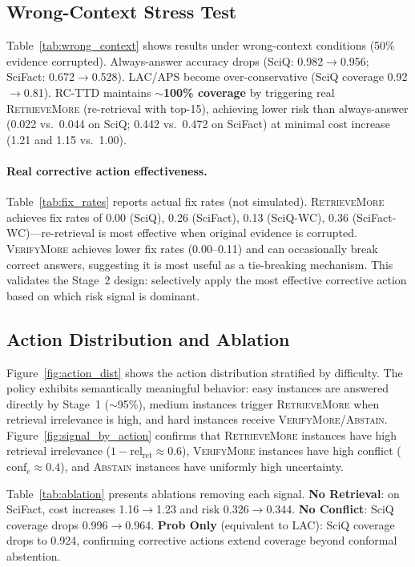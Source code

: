\documentclass[letterpaper]{article}
\begin{document}
\subsection{Wrong-Context Stress Test}

Table~\ref{tab:wrong_context} shows results under wrong-context conditions (50\% evidence corrupted). Always-answer accuracy drops (SciQ: 0.982$\to$0.956; SciFact: 0.672$\to$0.528). LAC/APS become over-conservative (SciQ coverage 0.92$\to$0.81). RC-TTD maintains \textbf{$\sim$100\% coverage} by triggering real \textsc{RetrieveMore} (re-retrieval with top-15), achieving lower risk than always-answer (0.022 vs.\ 0.044 on SciQ; 0.442 vs.\ 0.472 on SciFact) at minimal cost increase (1.21 and 1.15 vs.\ 1.00).

\paragraph{Real corrective action effectiveness.}
Table~\ref{tab:fix_rates} reports actual fix rates (not simulated). \textsc{RetrieveMore} achieves fix rates of 0.00 (SciQ), 0.26 (SciFact), 0.13 (SciQ-WC), 0.36 (SciFact-WC)---re-retrieval is most effective when original evidence is corrupted. \textsc{VerifyMore} achieves lower fix rates (0.00--0.11) and can occasionally break correct answers, suggesting it is most useful as a tie-breaking mechanism. This validates the Stage~2 design: selectively apply the most effective corrective action based on which risk signal is dominant.



\subsection{Action Distribution and Ablation}

Figure~\ref{fig:action_dist} shows the action distribution stratified by difficulty. The policy exhibits semantically meaningful behavior: easy instances are answered directly by Stage~1 ($\sim$95\%), medium instances trigger \textsc{RetrieveMore} when retrieval irrelevance is high, and hard instances receive \textsc{VerifyMore}/\textsc{Abstain}. Figure~\ref{fig:signal_by_action} confirms that \textsc{RetrieveMore} instances have high retrieval irrelevance ($1{-}\text{rel}_{\text{ret}} \approx 0.6$), \textsc{VerifyMore} instances have high conflict ($\text{conf}_e \approx 0.4$), and \textsc{Abstain} instances have uniformly high uncertainty.

Table~\ref{tab:ablation} presents ablations removing each signal. \textbf{No Retrieval}: on SciFact, cost increases 1.16$\to$1.23 and risk 0.326$\to$0.344. \textbf{No Conflict}: SciQ coverage drops 0.996$\to$0.964. \textbf{Prob Only} (equivalent to LAC): SciQ coverage drops to 0.924, confirming corrective actions extend coverage beyond conformal abstention.
\end{document}
